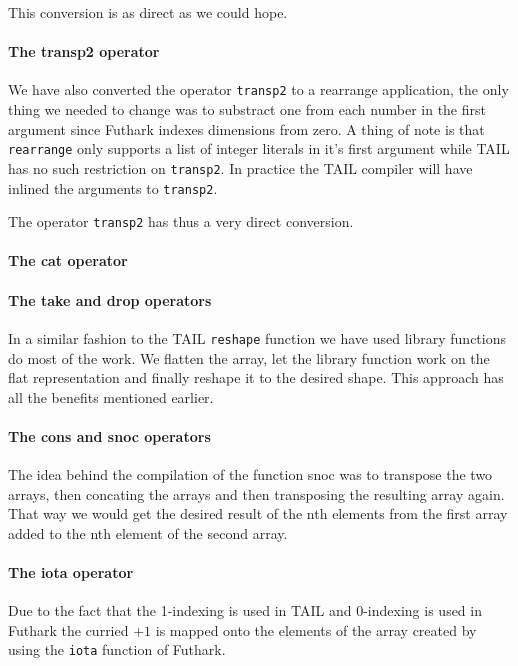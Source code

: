 \documentclass[11pt]{article}
\begin{document}
This conversion is as direct as we could hope.

\paragraph{The transp2 operator} 
We have also converted the operator {\tt transp2} to a rearrange application, the only thing we needed to change was to substract
one from each number in the first argument since Futhark indexes dimensions from zero.
A thing of note is that {\tt rearrange} only supports a list of integer literals in it's first argument while TAIL has no
such restriction on {\tt transp2}. In practice the TAIL compiler will have inlined the arguments to {\tt transp2}.

The operator {\tt transp2} has thus a very direct conversion.

\paragraph{The cat operator} 

\paragraph{The take and drop operators} 

In a similar fashion to the TAIL {\tt reshape} function we have used library functions do most of the work.
We flatten the array, let the library function work on the flat representation and finally reshape it to the desired shape.
This approach has all the benefits mentioned earlier.

\paragraph{The cons and snoc operators}
The idea behind the compilation of the function snoc was to transpose the two arrays, then concating the arrays and then transposing the resulting array again. That way we would get the desired result of the nth elements from the first array added to the nth element of the second array.\\

\paragraph{The iota operator} 
Due to the fact that the 1-indexing is used in TAIL and 0-indexing is used in Futhark the curried $+1$ is mapped onto the elements of the array created by using the {\tt iota} function of Futhark. 
\end{document}
